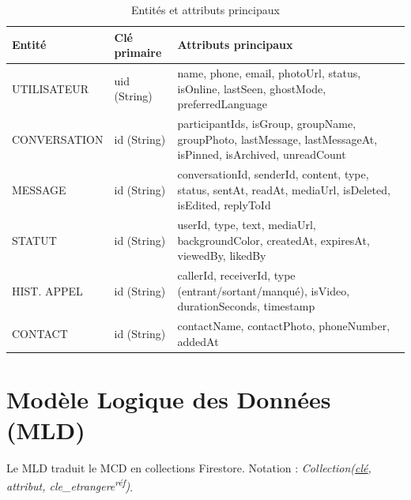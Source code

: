 \documentclass[12pt,a4paper]{report}
\begin{document}
\begin{table}[H]
\centering
\caption{Entités et attributs principaux}
\label{tab:entites}
\renewcommand{\arraystretch}{1.3}
\begin{tabularx}{\textwidth}{@{}llX@{}}
\toprule
\textbf{Entité} & \textbf{Clé primaire} & \textbf{Attributs principaux}\\\midrule
UTILISATEUR  & uid (String)
  & name, phone, email, photoUrl, status, isOnline, lastSeen, ghostMode, preferredLanguage \\
CONVERSATION & id (String)
  & participantIds, isGroup, groupName, groupPhoto, lastMessage, lastMessageAt, isPinned, isArchived, unreadCount \\
MESSAGE      & id (String)
  & conversationId, senderId, content, type, status, sentAt, readAt, mediaUrl, isDeleted, isEdited, replyToId \\
STATUT       & id (String)
  & userId, type, text, mediaUrl, backgroundColor, createdAt, expiresAt, viewedBy, likedBy \\
HIST. APPEL  & id (String)
  & callerId, receiverId, type (entrant/sortant/manqué), isVideo, durationSeconds, timestamp \\
CONTACT      & id (String)
  & contactName, contactPhoto, phoneNumber, addedAt \\
\bottomrule
\end{tabularx}
\end{table}

\section{Modèle Logique des Données (MLD)}

Le MLD traduit le MCD en collections Firestore.
Notation : \textit{Collection(\underline{clé}, attribut, \textit{cle\_etrangere}\textsuperscript{réf})}.
\end{document}
